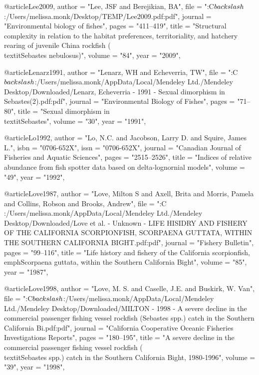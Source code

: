 @article{Lee2009,
    author = "{Lee, JSF and Berejikian, BA}",
    file = "{:C$\\backslash$:/Users/melissa.monk/Desktop/TEMP/Lee2009.pdf:pdf}",
    journal = "{Environmental biology of fishes}",
    pages = "{411--419}",
    title = "{{Structural complexity in relation to the habitat preferences, territoriality, and hatchery rearing of juvenile China rockfish (\\textit{{Sebastes} nebulosus})}}",
    volume = "{84}",
    year = "{2009}",
}

@article{Lenarz1991,
    author = "{Lenarz, WH and Echeverria, TW}",
    file = "{:C$\\backslash$:/Users/melissa.monk/AppData/Local/Mendeley Ltd./Mendeley Desktop/Downloaded/Lenarz, Echeverria - 1991 - Sexual dimorphism in Sebastes(2).pdf:pdf}",
    journal = "{Environmental Biology of Fishes}",
    pages = "{71--80}",
    title = "{{Sexual dimorphism in \\textit{{Sebastes}}}}",
    volume = "{30}",
    year = "{1991}",
}

@article{Lo1992,
    author = "{Lo, N.C. and Jacobson, Larry D. and Squire, James L.}",
    isbn = "{0706-652X}",
    issn = "{0706-652X}",
    journal = "{Canadian Journal of Fisheries and Aquatic Sciences}",
    pages = "{2515--2526}",
    title = "{{Indices of relative abundance from fish spotter data based on delta-lognornial models}}",
    volume = "{49}",
    year = "{1992}",
}


@article{Love1987,
    author = "{Love, Milton S and Axell, Brita and Morris, Pamela and Collins, Robson and Brooks, Andrew}",
    file = "{:C\\:/Users/melissa.monk/AppData/Local/Mendeley Ltd./Mendeley Desktop/Downloaded/Love et al. - Unknown - LIFE HISIDRY AND FISHERY OF THE CALIFORNIA SCORPIONFISH, SCORPAENA GUTTATA, WITHIN THE SOUTHERN CALIFORNIA BIGHT.pdf:pdf}",
    journal = "{Fishery Bulletin}",
    pages = "{99--116}",
    title = "{{Life history and fishery of the California scorpionfish, \\emph{Scorpaena guttata}, within the Southern California Bight}}",
    volume = "{85}",
    year = "{1987}",
}

@article{Love1998,
    author = "{Love, M. S. and Caselle, J.E. and Buskirk, W. Van}",
    file = "{:C$\\backslash$:/Users/melissa.monk/AppData/Local/Mendeley Ltd./Mendeley Desktop/Downloaded/MILTON - 1998 - A severe decline in the commercial passenger fishing vessel rockfish (Sebastes spp.) catch in the Southern California Bi.pdf:pdf}",
    journal = "{California Cooperative Oceanic Fisheries Investigations Reports}",
    pages = "{180--195}",
    title = "{{A severe decline in the commercial passenger fishing vessel rockfish (\\textit{{Sebastes}} spp.) catch in the Southern California Bight, 1980-1996}}",
    volume = "{39}",
    year = "{1998}",
}

